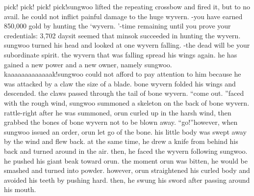 pick! pick! pick! pick!sungwoo lifted the repeating crossbow and fired it, but to no avail.
he could not inflict painful damage to the huge wyvern.
-you have earned 850,000 gold by hunting the ‘wyvern.
’-time remaining until you prove your credentials: 3,702 daysit seemed that minsok succeeded in hunting the wyvern.
 sungwoo turned his head and looked at one wyvern falling.
-the dead will be your subordinate spirit.
the wyvern that was falling spread his wings again.
 he has gained a new power and a new owner, namely sungwoo.
kaaaaaaaaaaaaak!sungwoo could not afford to pay attention to him because he was attacked by a claw the size of a blade.
 bone wyvern folded his wings and descended.
 the claws passed through the tail of bone wyvern.
“come out.
”faced with the rough wind, sungwoo summoned a skeleton on the back of bone wyvern.
rattle-right after he was summoned, orun curled up in the harsh wind, then grabbed the bones of bone wyvern not to be blown away.
“go!”however, when sungwoo issued an order, orun let go of the bone.
his little body was swept away by the wind and flew back.
 at the same time, he drew a knife from behind his back and turned around in the air.
then, he faced the wyvern following sungwoo.
 he pushed his giant beak toward orun.
the moment orun was bitten, he would be smashed and turned into powder.
however, orun straightened his curled body and avoided his teeth by pushing hard.
 then, he swung his sword after passing around his mouth.

